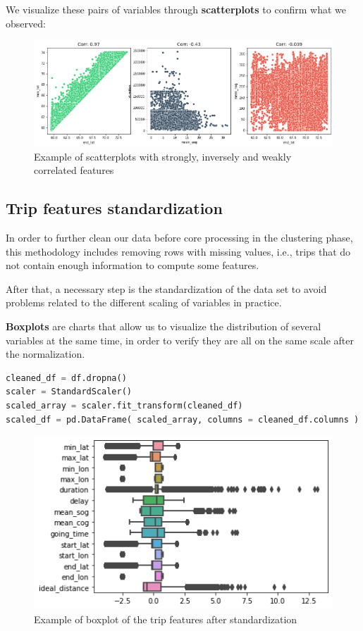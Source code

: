 We visualize these pairs of variables through \textbf{scatterplots} to confirm what we observed:

\begin{figure}[H]
    \centering
    \includegraphics[width=16cm]{Images/2/scatterplots.png}
    \caption{Example of scatterplots with strongly, inversely and weakly correlated features}
\end{figure}

\subsection{Trip features standardization}

In order to further clean our data before core processing in the clustering phase, this methodology includes removing rows with missing values, i.e., trips that do not contain enough information to compute some features.

After that, a necessary step is the standardization of the data set to avoid problems related to the different scaling of variables in practice.

\textbf{Boxplots} are charts that allow us to visualize the distribution of several variables at the same time, in order to verify they are all on the same scale after the normalization.

\begin{lstlisting}[language=Python]
cleaned_df = df.dropna()
scaler = StandardScaler()
scaled_array = scaler.fit_transform(cleaned_df)
scaled_df = pd.DataFrame( scaled_array, columns = cleaned_df.columns )
\end{lstlisting}

\begin{figure}[H]
    \centering
    \includegraphics[width=16cm]{Images/2/boxplot.png}
    \caption{Example of boxplot of the trip features after standardization}
\end{figure}


